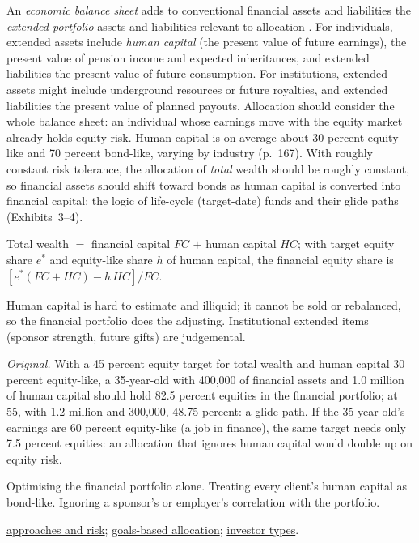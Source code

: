 \begin{qfmethod}\label{meth:economic-balance-sheet-allocation}
 An \emph{economic balance sheet} adds to conventional financial assets and liabilities the \emph{extended portfolio} assets and liabilities relevant to allocation \citep[chap.~5, sec.~4, pp.~165--168]{portfolio-management-in-practice-v1-2020}. For individuals, extended assets include \emph{human capital} (the present value of future earnings), the present value of pension income and expected inheritances, and extended liabilities the present value of future consumption. For institutions, extended assets might include underground resources or future royalties, and extended liabilities the present value of planned payouts. Allocation should consider the whole balance sheet: an individual whose earnings move with the equity market already holds equity risk. Human capital is on average about 30 percent equity-like and 70 percent bond-like, varying by industry (p.~167). With roughly constant risk tolerance, the allocation of \emph{total} wealth should be roughly constant, so financial assets should shift toward bonds as human capital is converted into financial capital: the logic of life-cycle (target-date) funds and their glide paths (Exhibits~3--4).

 Total wealth $=$ financial capital $FC$ $+$ human capital $HC$; with target equity share $e^*$ and equity-like share $h$ of human capital, the financial equity share is $[e^*(FC+HC)-h\,HC]/FC$.

 Human capital is hard to estimate and illiquid; it cannot be sold or rebalanced, so the financial portfolio does the adjusting. Institutional extended items (sponsor strength, future gifts) are judgemental.

 \emph{Original.} With a 45 percent equity target for total wealth and human capital 30 percent equity-like, a 35-year-old with 400{,}000 of financial assets and 1.0 million of human capital should hold 82.5 percent equities in the financial portfolio; at 55, with 1.2 million and 300{,}000, 48.75 percent: a glide path. If the 35-year-old's earnings are 60 percent equity-like (a job in finance), the same target needs only 7.5 percent equities: an allocation that ignores human capital would double up on equity risk.

 Optimising the financial portfolio alone. Treating every client's human capital as bond-like. Ignoring a sponsor's or employer's correlation with the portfolio.

 \hyperref[def:allocation-approaches-risk]{approaches and risk}; \hyperref[meth:goals-based-allocation-heuristics]{goals-based allocation}; \hyperref[def:investor-types-needs]{investor types}.

\end{qfmethod}

